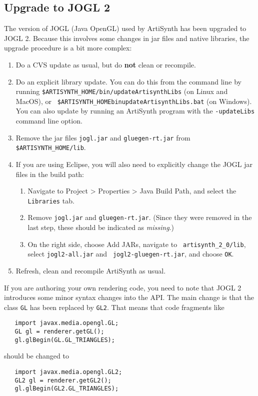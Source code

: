 \documentclass{article}
\begin{document}
\subsection*{Upgrade to JOGL 2}

The version of JOGL (Java OpenGL) used by ArtiSynth has been upgraded to JOGL 2.
Because this involves some changes in jar files and native libraries,
the upgrade procedure is a bit more complex:

\begin{enumerate}

\item Do a CVS update as usual, but do {\bf not} clean or recompile.

\item Do an explicit library update. You can do this from the command
line by running {\tt \$ARTISYNTH\_HOME/bin/updateArtisynthLibs} (on
Linux and MacOS), or {\tt
\$ARTISYNTH\_HOME\BKS bin\BKS updateArtisynthLibs.bat} (on Windows).  You can
also update by running an ArtiSynth program with the {\tt -updateLibs}
command line option.

\item Remove the jar files {\tt jogl.jar} and {\tt gluegen-rt.jar}
from {\tt \$ARTISYNTH\_HOME/lib}.

\item If you are using Eclipse, you will also need to explicitly change the
JOGL jar files in the build path:

\begin{enumerate}

\item Navigate to {\sf Project > Properties > Java Build Path},
and select the {\tt Libraries} tab.

\item Remove {\tt jogl.jar} and {\tt gluegen-rt.jar}. (Since they were
removed in the last step, these should be indicated as {\it missing}.)

\item On the right side, choose {\sf Add JARs}, navigate to {\tt
artisynth\_2\_0/lib}, select {\tt jogl2-all.jar} and {\tt
jogl2-gluegen-rt.jar}, and choose {\tt OK}.

\end{enumerate}

\item Refresh, clean and recompile ArtiSynth as usual.

\end{enumerate}

If you are authoring your own rendering code, you need to note that
JOGL 2 introduces some minor syntax changes into the API. The main
change is that the class {\tt GL} has been replaced by {\tt GL2}.
That means that code fragments like
\begin{lstlisting}
   import javax.media.opengl.GL;
   GL gl = renderer.getGL();
   gl.glBegin(GL.GL_TRIANGLES);
\end{lstlisting}
should be changed to
\begin{lstlisting}
   import javax.media.opengl.GL2;
   GL2 gl = renderer.getGL2();
   gl.glBegin(GL2.GL_TRIANGLES);
\end{lstlisting}
\end{document}
